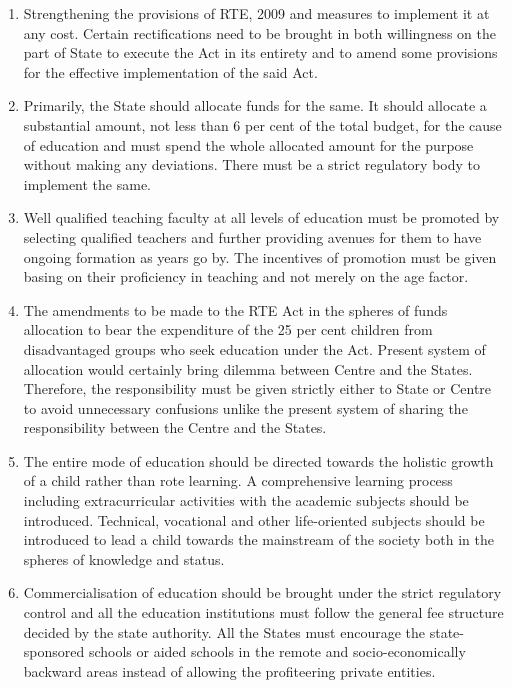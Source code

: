 \begin{multicols}{2}
\vspace{-.2cm}

\begin{enumerate}[label=$-$]
\itemsep=0pt
\item Strengthening the provisions of RTE, 2009 and measures to implement it at any
cost. Certain rectifications need to be brought in both willingness on the part of
State to execute the Act in its entirety and to amend some provisions for the
effective implementation of the said Act.

\item Primarily, the State should allocate funds for the same. It should allocate a
substantial amount, not less than 6 per cent of the total budget, for the cause of
education and must spend the whole allocated amount for the purpose without
making any deviations. There must be a strict regulatory body to implement the
same.

\item Well qualified teaching faculty at all levels of education must be promoted by
selecting qualified teachers and further providing avenues for them to have
ongoing formation as years go by. The incentives of promotion must be given
basing on their proficiency in teaching and not merely on the age factor.

\item The amendments to be made to the RTE Act in the spheres of funds allocation to
bear the expenditure of the 25 per cent children from disadvantaged groups who
seek education under the Act. Present system of allocation would certainly bring
dilemma between Centre and the States. Therefore, the responsibility must be
given strictly either to State or Centre to avoid unnecessary confusions unlike the
present system of sharing the responsibility between the Centre and the States.

\item The entire mode of education should be directed towards the holistic growth of a
child rather than rote learning. A comprehensive learning process including extracurricular activities with the academic subjects should be introduced. Technical, vocational and other life-oriented subjects should be introduced to lead a child
towards the mainstream of the society both in the spheres of knowledge and
status.

\item Commercialisation of education should be brought under the strict regulatory
control and all the education institutions must follow the general fee structure
decided by the state authority. All the States must encourage the state-sponsored
schools or aided schools in the remote and socio-economically backward areas
instead of allowing the profiteering private entities.


\end{enumerate}
\end{multicols}
